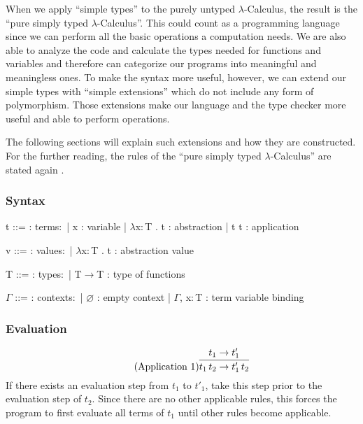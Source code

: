 
When we apply ``simple types'' to the purely untyped
$\lambda$-Calculus, the result is the ``pure simply typed $\lambda$-Calculus''.
This could count as a programming language since we can perform
all the basic operations a computation needs. We are also able to analyze
the code and calculate the types needed for functions and variables
and therefore can categorize our programs into meaningful and
meaningless ones. To make the syntax more useful, however, we can extend
our simple types with ``simple extensions'' which do not include any
form of polymorphism. Those extensions make our language and the type
checker more useful and able to perform operations.

The following sections will explain such extensions and how they are constructed.
For the further reading, the rules of the ``pure simply typed $\lambda$-Calculus''
are stated again \cite{pierce2002ProgLang}.

\subsubsection{Syntax}
\begin{bnfgrammar}
    t ::= : terms$\colon$
    | x : variable
    | $\lambda$x$\colon$T . t : abstraction
    | t t : application
\end{bnfgrammar}\leavevmode\newline

\begin{bnfgrammar}
    v ::= : values$\colon$
    | $\lambda$x$\colon$T . t : abstraction value
\end{bnfgrammar}\leavevmode\newline

\begin{bnfgrammar}
    T ::= : types$\colon$
    | T$\rightarrow$T : type of functions
\end{bnfgrammar}\leavevmode\newline

\begin{bnfgrammar}
    $\Gamma$ ::= : contexts$\colon$
    | $\varnothing$ : empty context
    | $\Gamma$, x$\colon$T : term variable binding
\end{bnfgrammar}\leavevmode\newline

\subsubsection{Evaluation}
\begin{equation*}
    \tag{Application 1}
    \infer{
        t_1\,t_2 \rightarrow t'_1\,t_2
    }{
        t_1 \rightarrow t'_1
    }
\end{equation*}
If there exists an evaluation step from $t_1$ to $t'_1$, take this step
prior to the evaluation step of $t_2$. Since there are no other applicable rules,
this forces the program to first evaluate all terms of $t_1$ until other rules become
applicable.

